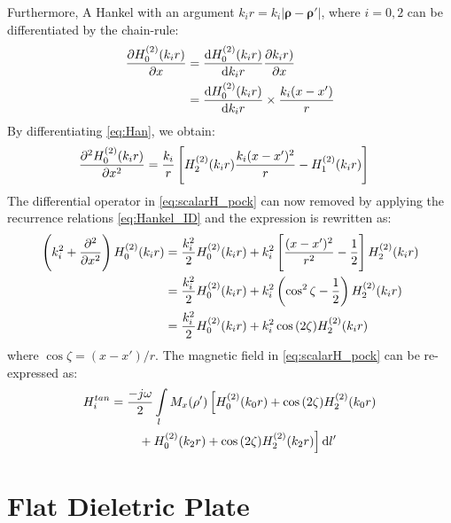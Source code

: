 \documentclass[11pt]{article}
\renewcommand{\v}[1]{\mathbf{#1}} %
\renewcommand{\O}{\omega}  %
\newcommand{\p}{\rho}  %
\newcommand{\x}{\times}  %
\renewcommand{\^}{\hat}  %
\newcommand*\diff{\mathop{}\!\mathrm{d}} %
\begin{document}
%
Furthermore, A Hankel with an argument $ k_i r = k_i|\v \p - \v \p'|$, where $i = 0,2$ can be differentiated by the chain-rule:
%
\begin{equation}
  \begin{split}
    \pdv{H_0^{(2)}(k_i r)}{x} &= \dv{H_0^{(2)}(k_i r)}{k_i r} \pdv{k_i r)}{x} \\
    &= \dv{H_0^{(2)}(k_i r)}{k_i r} \x \frac{k_i (x - x')}{r}
  \end{split}
  \label{eq:Han}
\end{equation}
%
By differentiating \eqref{eq:Han}, we obtain:
%
\begin{align}
  \pdv[2]{H_0^{(2)}(k_i r)}{x} &= \frac{k_i}{r} \left[H_2^{(2)}(k_i r) \frac{k_i (x - x')^2}{r} - H_1^{(2)}(k_i r) \right]
  \label{eq:difHan}
\end{align}
%
The differential operator in \eqref{eq:scalarH_pock} can now removed by applying the recurrence relations \eqref{eq:Hankel_ID} and the expression is rewritten as:
%
\begin{equation}
  \begin{split}
    \left(k_i^2 + \pdv[2]{}{x} \right) H_0^{(2)}(k_i r) &= \frac{k_i^2}{2} H_0^{(2)}(k_i r) + k_i^2 \left[ \frac{(x-x')^2}{r^2} - \frac{1}{2} \right] H_2^{(2)}(k_i r) \\
    &= \frac{k_i^2}{2} H_0^{(2)}(k_i r) + k_i^2 \left( \cos^2 \zeta - \frac{1}{2} \right) H_2^{(2)}(k_i r) \\
    &= \frac{k_i^2}{2} H_0^{(2)}(k_i r) + k_i^2 \cos {(2\zeta)} H_2^{(2)}(k_i r)
  \end{split}
  \label{eq:Hankel_final}
\end{equation}
%
where $\cos \zeta = {(x-x')/r}$. The magnetic field in \eqref{eq:scalarH_pock} can be re-expressed as:
%
\begin{align}
  H_i^{tan} &=  \frac{-j \O}{2} \int\limits_{l} M_x(\v \p') \left[ H_0^{(2)}(k_0 r) + \cos {(2 \zeta)} H_2^{(2)}(k_0 r) \right. \notag\\
  &\qquad \left. {} + H_0^{(2)}(k_2 r) + \cos {(2\zeta)} H_2^{(2)}(k_2 r)\right]\diff{l'}
  \label{eq:H_final}
\end{align}
\section*{Flat Dieletric Plate}
\end{document}
